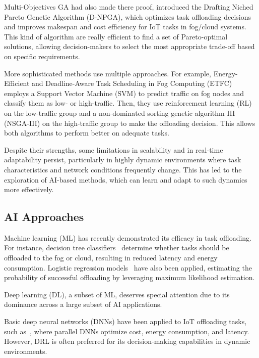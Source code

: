 \documentclass[preprint,3p,authoryear]{elsarticle}
\begin{document}
Multi-Objectives GA had also made there proof, \citep{bernard_d-npga_2024} introduced the Drafting Niched Pareto Genetic Algorithm (D-NPGA), which optimizes task offloading decisions and improves makespan and cost efficiency for IoT tasks in fog/cloud systems. This kind of algorithm are really efficient to find a set of Pareto-optimal solutions, allowing decision-makers to select the most appropriate trade-off based on specific requirements.

More sophisticated methods use multiple approaches. For example, Energy-Efficient and Deadline-Aware Task Scheduling in Fog Computing (ETFC)~\cite{pakmehr_etfc_2024} employs a Support Vector Machine (SVM) to predict traffic on fog nodes and classify them as low- or high-traffic. Then, they use reinforcement learning (RL) on the low-traffic group and a non-dominated sorting genetic algorithm III (NSGA-III) on the high-traffic group to make the offloading decision. This allows both algorithms to perform better on adequate tasks.

Despite their strengths, some limitations in scalability and in real-time adaptability persist, particularly in highly dynamic environments where task characteristics and network conditions frequently change. This has led to the exploration of AI-based methods, which can learn and adapt to such dynamics more effectively.


\subsection{AI Approaches}

Machine learning (ML) has recently demonstrated its efficacy in task offloading. For instance, decision tree classifiers~\citep{suryadevara_energy_2021} determine whether tasks should be offloaded to the fog or cloud, resulting in reduced latency and energy consumption. Logistic regression models~\citep{bukhari_intelligent_2022} have also been applied, estimating the probability of successful offloading by leveraging maximum likelihood estimation.

Deep learning (DL), a subset of ML, deserves special attention due to its dominance across a large subset of AI applications. 

Basic deep neural networks (DNNs) have been applied to IoT offloading tasks, such as~\citet{sarkar_deep_2022}, where parallel DNNs optimize cost, energy consumption, and latency. However, DRL is often preferred for its decision-making capabilities in dynamic environments.
\end{document}
